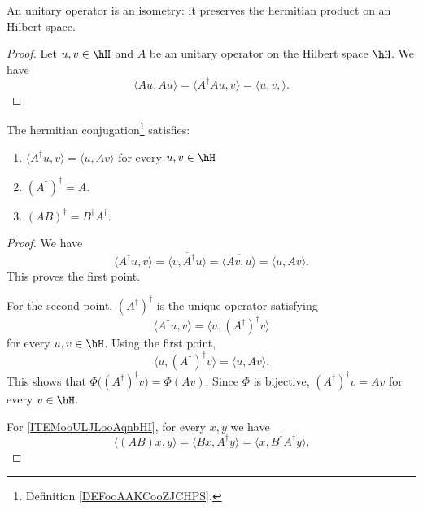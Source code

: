\begin{lemma}
	An unitary operator is an isometry: it preserves the hermitian product on an Hilbert space.
\end{lemma}

\begin{proof}
	Let \( u,v\in \hH\) and \( A\) be an unitary operator on the Hilbert space \( \hH\). We have
	\begin{equation}
		\langle Au, Au\rangle =\langle A^{\dag}Au, v\rangle =\langle u,v, \rangle .
	\end{equation}
\end{proof}

\begin{lemma}        \label{LEMooJYGRooPTMZwY}
	The hermitian conjugation\footnote{Definition \ref{DEFooAAKCooZJCHPS}.} satisfies:
	\begin{enumerate}
		\item
		      \( \langle A^{\dag}u, v\rangle =\langle u, Av\rangle \) for every \( u,v\in \hH\)
		\item
		      \( (A^{\dag})^{\dag}=A\).
		\item       \label{ITEMooULJLooAqnbHI}
		      \( (AB)^{\dag}=B^{\dag}A^{\dag}\).
	\end{enumerate}
\end{lemma}

\begin{proof}
	We have
	\begin{equation}
		\langle A^{\dag}u, v\rangle =\overline{ \langle v, A^{\dag}u\rangle  }=\overline{ \langle Av, u\rangle  }=\langle u, Av\rangle .
	\end{equation}
	This proves the first point.

	For the second point, \( (A^{\dag})^{\dag}\) is the unique operator satisfying
	\begin{equation}
		\langle A^{\dag}u, v\rangle =\langle u, (A^{\dag})^{\dag}v\rangle
	\end{equation}
	for every \( u,v\in \hH\). Using the first point,
	\begin{equation}
		\langle u, (A^{\dag})^{\dag} v\rangle =\langle u, Av\rangle .
	\end{equation}
	This shows that \( \Phi\big( (A^{\dag})^{\dag}v \big)=\Phi(Av)\). Since \( \Phi\) is bijective, \( (A^{\dag})^{\dag}v=Av\) for every \( v\in \hH\).

	For \ref{ITEMooULJLooAqnbHI}, for every \( x,y\) we have
	\begin{equation}
		\langle (AB)x, y\rangle =\langle Bx, A^{\dag}y\rangle =\langle x, B^{\dag}A^{\dag} y\rangle .
	\end{equation}
\end{proof}

